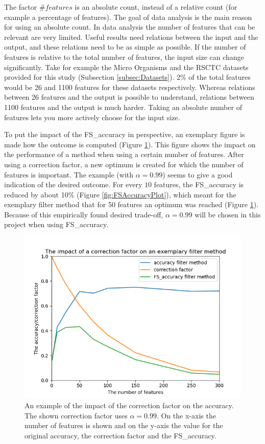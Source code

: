 	The factor $\#features$ is an absolute count, instead of a relative count (for example a percentage of features). The goal of data analysis is the main reason for using an absolute count. In data analysis the number of features that can be relevant are very limited. Useful results need relations between the input and the output, and these relations need to be as simple as possible. If the number of features is relative to the total number of features, the input size can change significantly. Take for example the Micro Organisms and the RSCTC datasets provided for this study (Subsection \ref{subsec:Datasets}). 2\% of the total features would be 26 and 1100 features for these datasets respectively. Whereas relations between 26 features and the output is possible to understand, relations between 1100 features and the output is much harder. Taking an absolute number of features lets you more actively choose for the input size.
	
	To put the impact of the FS\_accuracy in perspective, an exemplary figure is made how the outcome is computed (Figure \ref{fig:FSAccuracyExample}). This figure shows the impact on the performance of a method when using a certain number of features. After using a correction factor, a new optimum is created for which the number of features is important. The example (with $\alpha = 0.99$) seems to give a good indication of the desired outcome. For every $10$ features, the FS\_accuracy is reduced by about 10\% (Figure \ref{fig:FSAccuracyPlot}), which meant for the exemplary filter method that for 50 features an optimum was reached (Figure \ref{fig:FSAccuracyExample}). Because of this empirically found desired trade-off, $\alpha = 0.99$ will be chosen in this project when using FS\_accuracy. 
	
	\begin{figure}[H]
		\includegraphics[]{FS_accuracy_example.png}
		\caption{An example of the impact of the correction factor on the accuracy. The shown correction factor uses $\alpha = 0.99$. On the x-axis the number of features is shown and on the y-axis the value for the original accuracy, the correction factor and the FS\_accuracy.}
		\label{fig:FSAccuracyExample}
	\end{figure}
	
